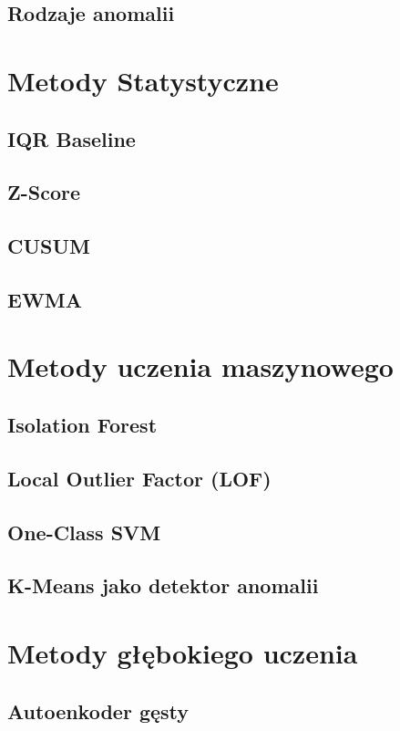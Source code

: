 \documentclass[a4paper,twoside,12pt]{book}
\begin{document}
	\subsection{Rodzaje anomalii}
	
	\section{Metody Statystyczne}
	\subsection{IQR Baseline}
	\subsection{Z-Score}
	\subsection{CUSUM}
	\subsection{EWMA}
	
	\section{Metody uczenia maszynowego}
	\subsection{Isolation Forest}
	\subsection{Local Outlier Factor (LOF)}
	\subsection{One-Class SVM}
	\subsection{K-Means jako detektor anomalii}
	
	\section{Metody głębokiego uczenia}
	
	\subsection{Autoenkoder gęsty}
\end{document}
